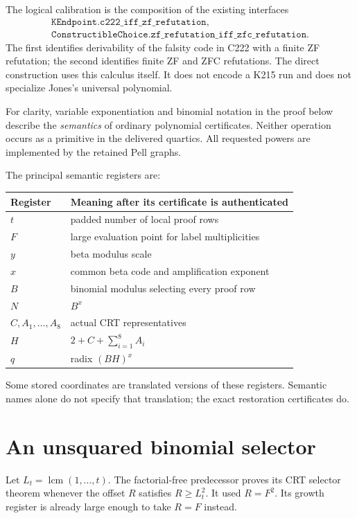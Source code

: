\documentclass[11pt]{article}
\theoremstyle{remark}\newtheorem{remark}[theorem]{Remark}
\newcommand{\lcm}{\operatorname{lcm}}
\begin{document}
The logical calibration is the composition of the existing interfaces
\begin{align*}
 \texttt{KEndpoint.c222\_iff\_zf\_refutation},\\
 \texttt{ConstructibleChoice.zf\_refutation\_iff\_zfc\_refutation}.
\end{align*}
The first identifies derivability of the falsity code in C222 with a
finite ZF refutation; the second identifies finite ZF and ZFC refutations.
The direct construction uses this calculus itself. It does not encode a
K215 run and does not specialize Jones's universal polynomial.

For clarity, variable exponentiation and binomial notation in the proof
below describe the \emph{semantics} of ordinary polynomial certificates.
Neither operation occurs as a primitive in the delivered quartics.
All requested powers are implemented by the retained Pell graphs.

The principal semantic registers are:
\begin{center}
\begin{tabular}{ll}
\toprule
Register & Meaning after its certificate is authenticated\\
\midrule
$t$ & padded number of local proof rows\\
$F$ & large evaluation point for label multiplicities\\
$y$ & beta modulus scale\\
$x$ & common beta code and amplification exponent\\
$B$ & binomial modulus selecting every proof row\\
$N$ & $B^x$\\
$C,A_1,\ldots,A_8$ & actual CRT representatives\\
$H$ & $2+C+\sum_{i=1}^{8}A_i$\\
$q$ & radix $(BH)^x$\\
\bottomrule
\end{tabular}
\end{center}
Some stored coordinates are translated versions of these registers.
Semantic names alone do not specify that translation; the exact
restoration certificates do.

\section{An unsquared binomial selector}

Let $L_t=\lcm(1,\ldots,t)$. The factorial-free predecessor proves its
CRT selector theorem whenever the offset $R$ satisfies $R\ge L_t^2$.
It used $R=F^2$. Its growth register is already large enough to take
$R=F$ instead.
\end{document}
